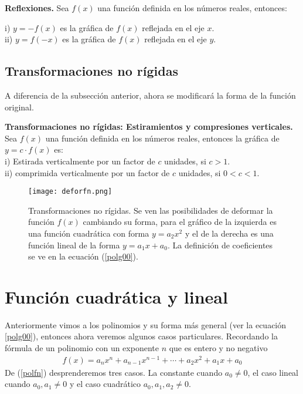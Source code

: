 \begin{mydef}
\textbf{Reflexiones.} Sea $f(x)$ una función definida en los números reales, entonces:

\noindent i) $y=-f(x)$ es la gráfica de $f(x)$ reflejada en el eje $x$.\\
\noindent ii) $y=f(-x)$ es la gráfica de $f(x)$ reflejada en el eje $y$. \\
\end{mydef}
\subsection{Transformaciones no rígidas}
A diferencia de la subsección anterior, ahora se modificará la forma de la función original. 
\begin{mydef}
\textbf{Transformaciones no rígidas: Estiramientos y compresiones verticales.} Sea $f(x)$ una función definida en los números reales, entonces la gráfica de $y=c\cdot f(x)$ es:\\

\noindent i) Estirada verticalmente por un factor de $c$ unidades, si $c>1$.\\

\noindent ii) comprimida verticalmente por un factor de $c$ unidades, si $0<c<1$.\\
\end{mydef}

\begin{center}
\begin{figure}[h!]
\centering
\texttt{[image: deforfn.png]}
\caption[Transformaciones no rígidas.]{Transformaciones no rígidas. Se ven las posibilidades de deformar la función $f(x)$ cambiando su forma, para el gráfico de la izquierda es una función cuadrática con forma $y=a_{2}x^{2}$ y el de la derecha es una función lineal de la forma $y=a_{1}x+a_{0}$. La definición de coeficientes se ve en la ecuación (\ref{polg00}).}
\label{deforfx}
\end{figure}
\end{center}

\section{Función cuadrática y lineal}
\label{fnlincua}
Anteriormente vimos a los polinomios y su forma más general (ver la ecuación  \ref{polg00}), entonces ahora veremos algunos casos particulares. Recordando la fórmula de un polinomio con un exponente $n$ que es entero y no negativo
\begin{eqnarray}
f(x)=a_{n}x^{n}+a_{n-1}x^{n-1}+\cdots +a_{2}x^{2}+a_{1}x+a_{0}
\label{polfn}
\end{eqnarray}
De (\ref{polfn}) desprenderemos tres casos. La constante cuando $a_{0}\neq 0$, el caso lineal cuando $a_{0},a_{1}\neq 0$ y el caso cuadrático $a_{0},a_{1}, a_{2}\neq 0$.

